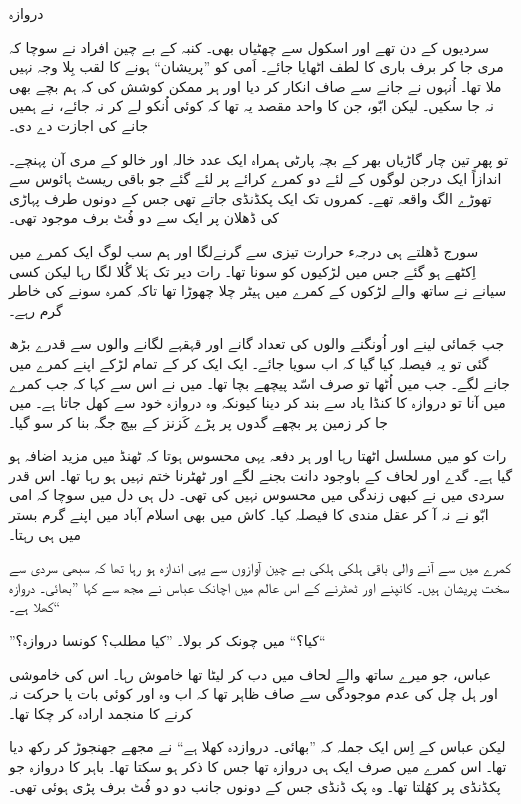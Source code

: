 \documentclass{article}
\begin{document}
\begin{center} \Large
   دروازہ
\end{center}

سردیوں کے دن تھے اور اسکول سے چھٹیاں بھی۔ کنبہ کے بے چین افراد نے سوچا کہ مری جا کر برف باری کا لطف اٹھایا جائے۔ اَمی کو ''پریشان`` ہونے کا لقب بِلا وجہ نہیں ملا تھا۔ اُنہوں نے جانے سے صاف انکار کر دیا اور ہر ممکن کوشش کی کہ ہم بچے بھی نہ جا سکیں۔ لیکن ابّو، جن کا واحد مقصد یہ تھا کہ کوئی اُنکو لے کر نہ جائے، نے ہمیں جانے کی اجازت دے دی۔

تو پھر تین چار گاڑیاں بھر کے بچہ پارٹی ہمراہ ایک عدد خالہ اور خالو کے مری آن پہنچے۔ اندازاً ایک درجن لوگوں کے لئے دو کمرے کرائے پر لئے گئے جو باقی ریسٹ ہائوس سے تھوڑے الگ واقعہ تھے۔ کمروں تک ایک پکڈنڈی جاتے تھی جس کے دونوں طرف پہاڑی کی ڈھلان پر ایک سے دو فُٹ برف موجود تھی۔

سورج ڈھلتے ہی درجہء حرارت تیزی سے گرنےلگا اور ہم سب لوگ ایک کمرے میں اِکٹھے ہو گئے جس میں لڑکیوں کو سونا تھا۔ رات دیر تک ہَلا گُلا لگا رہا لیکن کسی سیانے نے ساتھ والے لڑکوں کے کمرے میں ہیٹر چلا چھوڑا تھا تاکہ کمرہ سونے کی خاطر گرم رہے۔

جب جَمائی لینے اور اُونگنے والوں کی تعداد گانے اور قہقہے لگانے والوں سے قدرے بڑھ گئی تو یہ فیصلہ کیا گیا کہ اب سویا جائے۔ ایک ایک کر کے تمام لڑکے اپنے کمرے میں جانے لگے۔ جب میں اُٹھا تو صرف اسّد پیچھے بچا تھا۔ میں نے اس سے کہا کہ جب کمرے میں آنا تو دروازہ کا کنڈا یاد سے بند کر دینا کیونکہ وہ دروازہ خود سے کھل جاتا ہے۔ میں جا کر زمین پر بچھے گدوں پر پڑے کَزنز کے بیچ جگہ بنا کر سو گیا۔

رات کو میں مسلسل اٹھتا رہا اور ہر دفعہ یہی محسوس ہوتا کہ ٹھنڈ میں مزید اضافہ ہو گیا ہے۔ گدے اور لحاف کے باوجود دانت بجنے لگے اور ٹھٹرنا ختم نہیں ہو رہا تھا۔ اس قدر سردی میں نے کبھی زندگی میں محسوس نہیں کی تھی۔ دل ہی دل میں سوچا کہ امی ابّو نے نہ آ کر عقل مندی کا فیصلہ کیا۔ کاش میں بھی اسلام آباد میں اپنے گرم بستر میں ہی رہتا۔

کمرے میں سے آنے والی باقی ہلکی ہلکی بے چین آوازوں سے یہی اندازہ ہو رہا تھا کہ سبھی سردی سے سخت پریشان ہیں۔ کانپنے اور ٹھٹرنے کے اس عالم میں اچانک عباس نے مجھ سے کہا ''بھائی۔ دروازہ کھلا ہے۔``

''کیا؟`` میں چونک کر بولا۔ ''کیا مطلب؟ کونسا دروازہ؟``

عباس، جو میرے ساتھ والے لحاف میں دب کر لیٹا تھا خاموش رہا۔ اس کی خاموشی اور ہل چل کی عدم موجودگی سے صاف ظاہر تھا کہ اب وہ اور کوئی بات یا حرکت نہ کرنے کا منجمد ارادہ کر چکا تھا۔
 
لیکن عباس کے اِس ایک جملہ کہ ''بھائی۔ دروازدہ کھلا ہے`` نے مجھے جھنجوڑ کر رکھ دیا تھا۔ اس کمرے میں صرف ایک ہی دروازہ تھا جس کا ذکر ہو سکتا تھا۔ باہر کا دروازہ جو پکڈنڈی پر کھُلتا تھا۔ وہ پک ڈنڈی جس کے دونوں جانب دو دو فُٹ برف پڑی ہوئی تھی۔
\end{document}
